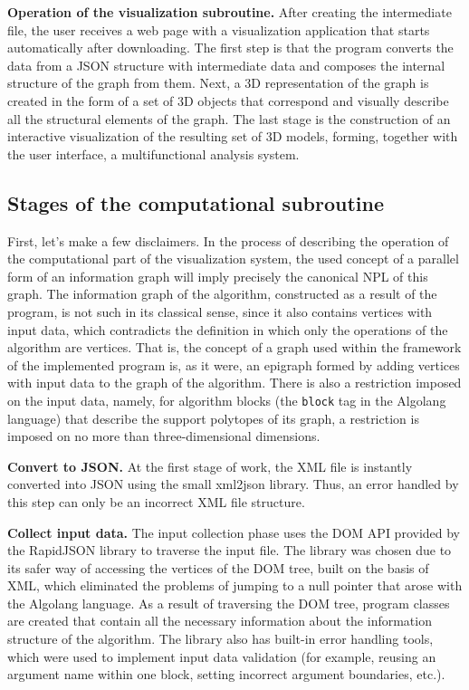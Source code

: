 \textbf{Operation of the visualization subroutine.} After creating the intermediate file, the user receives a web page with a visualization application that starts automatically after downloading. The first step is that the program converts the data from a JSON structure with intermediate data and composes the internal structure of the graph from them. Next, a 3D representation of the graph is created in the form of a set of 3D objects that correspond and visually describe all the structural elements of the graph. The last stage is the construction of an interactive visualization of the resulting set of 3D models, forming, together with the user interface, a multifunctional analysis system.

\subsection{Stages of the computational subroutine}

First, let's make a few disclaimers. In the process of describing the operation of the computational part of the visualization system, the used concept of a parallel form of an information graph will imply precisely the canonical NPL of this graph. The information graph of the algorithm, constructed as a result of the program, is not such in its classical sense, since it also contains vertices with input data, which contradicts the definition in which only the operations of the algorithm are vertices. That is, the concept of a graph used within the framework of the implemented program is, as it were, an epigraph formed by adding vertices with input data to the graph of the algorithm. There is also a restriction imposed on the input data, namely, for algorithm blocks (the \texttt{block} tag in the Algolang language) that describe the support polytopes of its graph, a restriction is imposed on no more than three-dimensional dimensions.

\textbf{Convert to JSON.} At the first stage of work, the XML file is instantly converted into JSON using the small xml2json library. Thus, an error handled by this step can only be an incorrect XML file structure.

\textbf{Collect input data.} The input collection phase uses the DOM API provided by the RapidJSON library to traverse the input file. The library was chosen due to its safer way of accessing the vertices of the DOM tree, built on the basis of XML, which eliminated the problems of jumping to a null pointer that arose with the Algolang language. As a result of traversing the DOM tree, program classes are created that contain all the necessary information about the information structure of the algorithm. The library also has built-in error handling tools, which were used to implement input data validation (for example, reusing an argument name within one block, setting incorrect argument boundaries, etc.).

